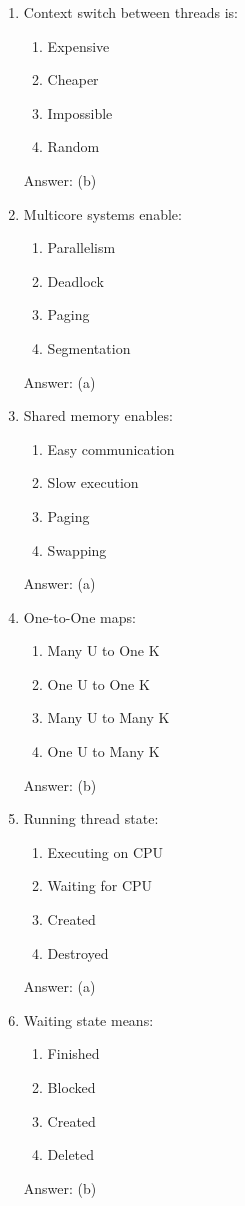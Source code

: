 \begin{enumerate}
\item Context switch between threads is:
\begin{enumerate}[label=(\alph*)]
\item Expensive
\item Cheaper
\item Impossible
\item Random
\end{enumerate}
Answer: (b)

\item Multicore systems enable:
\begin{enumerate}[label=(\alph*)]
\item Parallelism
\item Deadlock
\item Paging
\item Segmentation
\end{enumerate}
Answer: (a)

\item Shared memory enables:
\begin{enumerate}[label=(\alph*)]
\item Easy communication
\item Slow execution
\item Paging
\item Swapping
\end{enumerate}
Answer: (a)

\item One-to-One maps:
\begin{enumerate}[label=(\alph*)]
\item Many U to One K
\item One U to One K
\item Many U to Many K
\item One U to Many K
\end{enumerate}
Answer: (b)

\item Running thread state:
\begin{enumerate}[label=(\alph*)]
\item Executing on CPU
\item Waiting for CPU
\item Created
\item Destroyed
\end{enumerate}
Answer: (a)

\item Waiting state means:
\begin{enumerate}[label=(\alph*)]
\item Finished
\item Blocked
\item Created
\item Deleted
\end{enumerate}
Answer: (b)


\end{enumerate}
